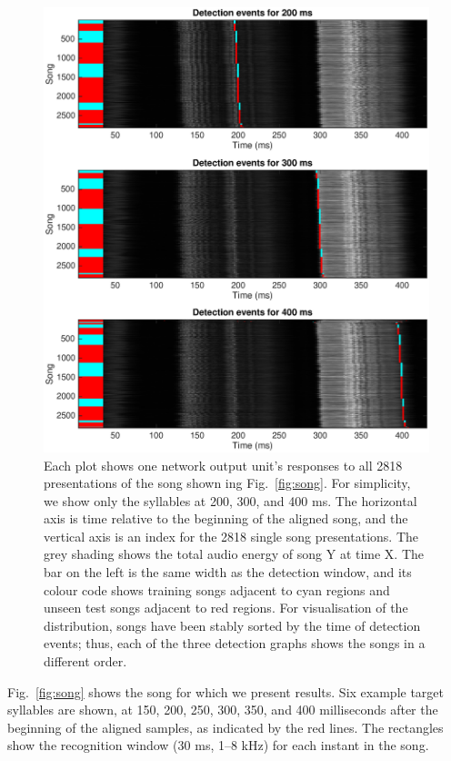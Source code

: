 \documentclass[10pt,letterpaper]{article}
\newcommand\fig[1]{Fig.~\ref{#1}}
\begin{document}
\begin{figure}
  \includegraphics[width=\textwidth]{detection_raster}
  \caption{Each plot shows one network output unit's responses to all
    2818 presentations of the song shown ing \fig{fig:song}.  For
    simplicity, we show only the syllables at 200, 300, and 400 ms. The
    horizontal axis is time relative to the beginning of the aligned
    song, and the vertical axis is an index for the 2818 single song
    presentations. The grey shading shows the total audio energy of
    song Y at time X. The bar on the left is the same width as the
    detection window, and its colour code shows training songs
    adjacent to cyan regions and unseen test songs adjacent to red
    regions. For visualisation of the distribution, songs have been
    stably sorted by the time of detection events; thus, each of the
    three detection graphs shows the songs in a different order.}
  \label{fig:detection_raster}
\end{figure}


\fig{fig:song} shows the song for which we present results.  Six example target syllables are shown, at 150, 200, 250, 300, 350, and 400 milliseconds after the beginning of the aligned samples, as indicated by the red lines.  The rectangles show the recognition window (30 ms, 1--8 kHz) for each instant in the song.
\end{document}
